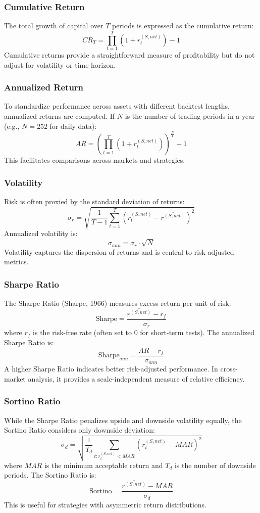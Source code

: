 \subsubsection{Cumulative Return}  
The total growth of capital over $T$ periods is expressed as the cumulative return:
\[
CR_T = \prod_{t=1}^T (1 + r_t^{(S,net)}) - 1
\]
Cumulative returns provide a straightforward measure of profitability but do not adjust for volatility or time horizon.

\subsubsection{Annualized Return}  
To standardize performance across assets with different backtest lengths, annualized returns are computed. If $N$ is the number of trading periods in a year (e.g., $N=252$ for daily data):
\[
AR = \left( \prod_{t=1}^T (1 + r_t^{(S,net)}) \right)^{\frac{N}{T}} - 1
\]
This facilitates comparisons across markets and strategies.

\subsubsection{Volatility}  
Risk is often proxied by the standard deviation of returns:
\[
\sigma_r = \sqrt{\frac{1}{T-1} \sum_{t=1}^T \left(r_t^{(S,net)} - \overline{r^{(S,net)}}\right)^2}
\]
Annualized volatility is:
\[
\sigma_{ann} = \sigma_r \cdot \sqrt{N}
\]
Volatility captures the dispersion of returns and is central to risk-adjusted metrics.

\subsubsection{Sharpe Ratio}  
The Sharpe Ratio (Sharpe, 1966) measures excess return per unit of risk:
\[
\text{Sharpe} = \frac{\overline{r^{(S,net)}} - r_f}{\sigma_r}
\]
where $r_f$ is the risk-free rate (often set to 0 for short-term tests). The annualized Sharpe Ratio is:
\[
\text{Sharpe}_{ann} = \frac{AR - r_f}{\sigma_{ann}}
\]
A higher Sharpe Ratio indicates better risk-adjusted performance. In cross-market analysis, it provides a scale-independent measure of relative efficiency.

\subsubsection{Sortino Ratio}  
While the Sharpe Ratio penalizes upside and downside volatility equally, the Sortino Ratio considers only downside deviation:
\[
\sigma_d = \sqrt{\frac{1}{T_d} \sum_{t: r_t^{(S,net)} < MAR} (r_t^{(S,net)} - MAR)^2}
\]
where $MAR$ is the minimum acceptable return and $T_d$ is the number of downside periods. The Sortino Ratio is:
\[
\text{Sortino} = \frac{\overline{r^{(S,net)}} - MAR}{\sigma_d}
\]
This is useful for strategies with asymmetric return distributions.

